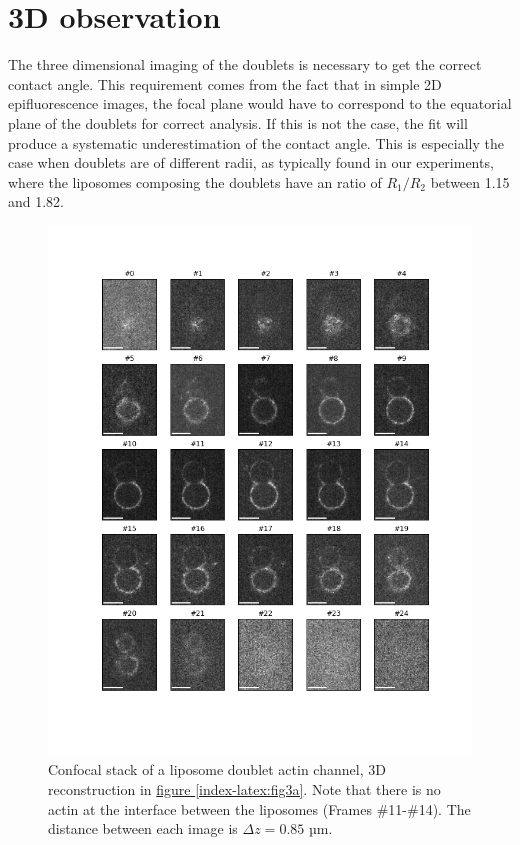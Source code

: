 \documentclass[A4paperpaper,11pt,english]{sphinxmanual}
\begin{document}
\section{3D observation}
\label{index-latex:d-obs}\label{index-latex:d-observation}
The three dimensional imaging of the doublets is necessary to get the correct
contact angle. This requirement comes from the fact that in simple 2D epifluorescence
images, the focal plane would have to correspond to the equatorial plane of the doublets for correct analysis. If
this is not the case, the fit will produce a systematic underestimation of the contact angle.
This is especially the case when doublets are of different radii, as typically found in our
experiments, where the liposomes composing the doublets have an ratio of \(R_1 / R_2\) between 1.15 and 1.82.
\begin{figure}[htbp]
\centering
\capstart

\includegraphics[width=0.900\linewidth]{light_table.png}
\caption{Confocal stack of a liposome doublet actin channel, 3D reconstruction in
\hyperref[index-latex:fig3a]{figure  \ref*{index-latex:fig3a}}. Note that there is no actin at the interface between
the liposomes (Frames \#11-\#14). The distance between each image is \(\Delta z=0.85\) µm.}\label{index-latex:confocal-stack}\end{figure}
\end{document}
